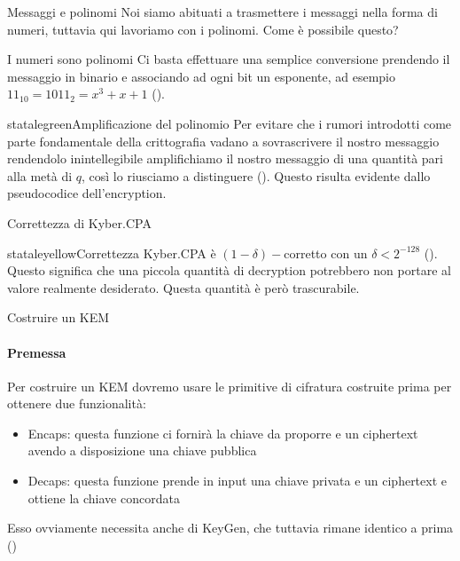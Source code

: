 \begin{frame}{Messaggi e polinomi}
    Noi siamo abituati a trasmettere i messaggi nella forma di numeri, tuttavia qui lavoriamo con i polinomi. Come è possibile questo?

    \begin{block}{I numeri sono polinomi}
        Ci basta effettuare una semplice conversione prendendo il messaggio in binario e associando ad ogni bit un esponente, ad esempio $11_{10}=1011_2=x^3+x+1$ (\cite{kyber17,babykyber}).
    \end{block}

    \begin{colorblock}{statalegreen}{Amplificazione del polinomio}
        Per evitare che i rumori introdotti come parte fondamentale della crittografia vadano a sovrascrivere il nostro messaggio rendendolo inintellegibile amplifichiamo il nostro messaggio di una quantità pari alla metà di $q$, così lo riusciamo a distinguere (\cite{kyber17,babykyber}). Questo risulta evidente dallo pseudocodice dell'encryption.
    \end{colorblock}
\end{frame}

    \begin{frame}{Correttezza di Kyber.CPA}

    \begin{colorblock}{stataleyellow}{Correttezza}
        Kyber.CPA è $(1-\delta)-$corretto con un $\delta<2^{-128}$ (\cite{kyber17}). Questo significa che una piccola quantità di decryption potrebbero non portare al valore realmente desiderato. Questa quantità è però trascurabile.
    \end{colorblock}

    \end{frame}

\begin{frame}{Costruire un KEM}
    \framesubtitle{Premessa}
    Per costruire un KEM dovremo usare le primitive di cifratura costruite prima per ottenere due funzionalità:\begin{itemize}
    \item Encaps: questa funzione ci fornirà la chiave da proporre e un ciphertext avendo a disposizione una chiave pubblica
    \item Decaps: questa funzione prende in input una chiave privata e un ciphertext e ottiene la chiave concordata
    \end{itemize}
    Esso ovviamente necessita anche di KeyGen, che tuttavia rimane identico a prima (\cite{kyber17})
\end{frame}

